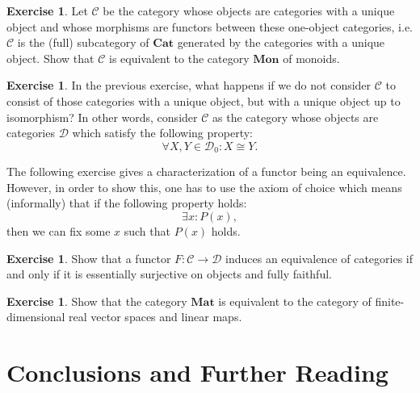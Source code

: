 \documentclass[a4paper,11pt, oneside,titlepage=false]{scrbook}
\theoremstyle{plain}
\theoremstyle{definition}
\newtheorem{exer}[thm]{Exercise}
\newcommand{\Cat}[1]{\mathcal{#1}}
\newcommand{\CC}{\Cat{C}}
\newcommand{\DD}{\Cat{D}}
\newcommand{\Catb}[1]{\mathbf{#1}}
\newcommand{\CAT}{\Catb{Cat}}
\newcommand{\MON}{\Catb{Mon}}
\newcommand{\MAT}{\Catb{Mat}}
\newcommand{\Ob}[1]{{#1}_0}
\begin{document}
\begin{exer} Let $\CC$ be the category whose objects are categories with a unique object and whose morphisms are functors between these one-object categories, i.e. $\CC$ is the (full) subcategory of $\CAT$ generated by the categories with a unique object. Show that $\CC$ is equivalent to the category $\MON$ of monoids.
\end{exer}
\begin{exer}
In the previous exercise, what happens if we do not consider $\CC$ to consist of those categories with a unique object, but with a unique object up to isomorphism? In other words, consider $\CC$ as the category whose objects are categories $\DD$ which satisfy the following property: 
\[
\forall X,Y \in \Ob{\DD}: X\cong Y.
\]
\end{exer}

The following exercise gives a characterization of a functor being an equivalence. However, in order to show this, one has to use the axiom of choice which means (informally) that if the following property holds:
\[ 
\exists x: P(x),
\]
then we can fix some $x$ such that $P(x)$ holds.
\begin{exer} Show that a functor $F:\CC\to\DD$ induces an equivalence of categories if and only if it is essentially surjective on objects and fully faithful.
\end{exer}

\begin{exer}
  Show that the category $\MAT$ is equivalent to the category of finite-dimensional real vector spaces and linear maps.
\end{exer}









\chapter{Conclusions and Further Reading}
\end{document}
